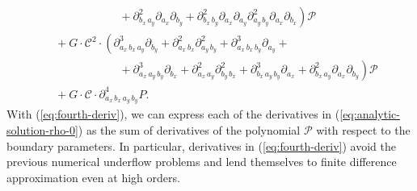 \begin{align}
                                                                                             & \left. \qquad\qquad\qquad +\partial^2_{b_x\, a_y} \partial_{a_x} \partial_{b_y} + \partial^2_{b_x\, b_y} \partial_{a_x} \partial_{a_y} \partial^2_{a_y\, b_y} \partial_{a_x} \partial_{b_x} \right) \mathcal{P} \nonumber \\
                                                                                             &\,\, + G \cdot \mathcal{C}^2 \cdot \left( \partial^3_{a_x\,b_x\,a_y} \partial_{b_y} + \partial^2_{a_x\,b_x}\partial^2_{a_y\,b_y} + \partial^3_{a_x\,b_x\,b_y}\partial_{a_y}  + \right. \nonumber \\
                                                                                             & \left. \qquad\qquad\qquad + \partial^3_{a_x\,a_y\,b_y} \partial_{b_x} + \partial^2_{a_x\,a_y} \partial^2_{b_y\,b_x} + \partial^3_{b_x\,a_y\,b_y}\partial_{a_x} + \partial^2_{b_x\,a_y}\partial_{a_x}\partial_{b_y} \right) \mathcal{P} \nonumber \\
                                                                                             &\,\, + G \cdot \mathcal{C} \cdot \partial^4_{a_x\,b_x\,a_y\,b_y} P. \label{eq:fourth-deriv}
\end{align}
With (\ref{eq:fourth-deriv}), we can express each of the derivatives
in (\ref{eq:analytic-solution-rho-0}) as the sum of derivatives of the
polynomial $\mathcal{P}$ with respect to the boundary parameters. In
particular, derivatives in (\ref{eq:fourth-deriv}) avoid the previous
numerical underflow problems and lend themselves to finite difference
approximation even at high orders.

